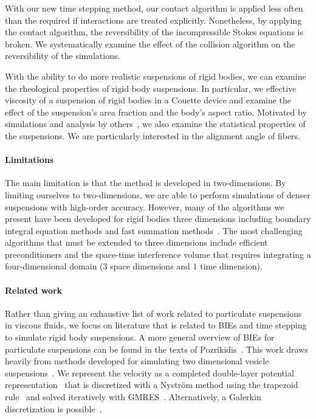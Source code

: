 \documentclass[preprint, 10pt]{elsarticle}
\begin{document}
With our new time stepping method, our contact algorithm is applied less
often than the required if interactions are treated explicitly.
Nonetheless, by applying the contact algorithm, the reversibility of the
incompressible Stokes equations is broken.  We systematically examine
the effect of the collision algorithm on the reversibility of the
simulations.

With the ability to do more realistic suspensions of rigid bodies, we
can examine the rheological properties of rigid body suspensions.  In
particular, we effective viscosity of a suspension of rigid bodies in a
Couette device and examine the effect of the suspension's area fraction
and the body's aspect ratio.  Motivated by simulations and analysis by
others~\cite{}, we also examine the statistical properties of the
suspensions.  We are particularly interested in the alignment angle of
fibers.

\paragraph{Limitations} The main limitation is that the method is
developed in two-dimensions.  By limiting ourselves to two-dimensions,
we are able to perform simulations of denser suspensions with high-order
accuracy.  However, many of the algorithms we present have been
developed for rigid bodies three dimensions including boundary integral
equation methods and fast summation methods~\cite{cor-gre-rac-vee2017,
kli-tor2014, kli-tor2016}.  The most challenging algorithms that must be
extended to three dimensions include efficient preconditioners and the
space-time interference volume that requires integrating a
four-dimensional domain ($3$ space dimensions and $1$ time dimension).


\paragraph{Related work} Rather than giving an exhaustive list of work
related to particulate suspensions in viscous fluids, we focus on
literature that is related to BIEs and time stepping to simulate rigid
body suspensions.  A more general overview of BIEs for particulate
suspensions can be found in the texts of
Pozrikidis~\cite{Pozrikidis1992, Guazzelli2011, Karrila1991}.  This work
draws heavily from methods developed for simulating two dimensional
vesicle suspensions~\cite{Quaife2014, Quaife2015, qua-bir2016,
Rahimian2010, Lu2017}.  We represent the velocity as a completed
double-layer potential representation~\cite{Power1987, Power1993,
Karrila1989} that is discretized with a Nystr\"om method using the
trapezoid rule~\cite{Trefethan2014} and solved iteratively with
GMRES~\cite{Saad1986}.  Alternatively, a Galerkin discretization is
possible~\cite{Mammoli1999, Mammoli2002, Mammoli2006}.
\end{document}

